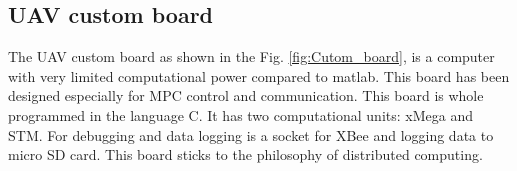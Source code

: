 \documentclass[a4paper,11pt,titlepage]{article}
\begin{document}
\subsection{UAV custom board}
\label{sec:custom_board}
The UAV custom board \cite{tomas} as shown in the Fig. \ref{fig:Cutom_board}, is a computer with very limited computational power compared to matlab. This board has been designed \cite{tomas} especially for MPC control and communication. This board is whole programmed in the language C. It has two computational units: xMega and STM. For debugging and data logging is a socket for XBee and logging data to micro SD card. This board sticks to the philosophy of distributed computing.

\begin{figure}[h]
\label{fig:Cutom_board}
\centering

\begin{subfigure}[b]{0.515\textwidth}
\end{subfigure}
\end{figure}
\end{document}
